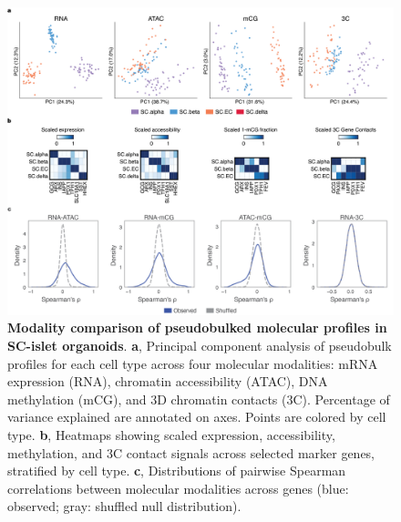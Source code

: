 \begin{figure}[p]
    \centering
    \includegraphics[width=1\textwidth]{3_figures-and-files/ExtendedFig2.png}
    \caption[Modality comparison of pseudobulked profiles]{\textbf{Modality comparison of pseudobulked molecular profiles in SC-islet organoids}. \textbf{a}, Principal component analysis of pseudobulk profiles for each cell type across four molecular modalities: mRNA expression (RNA), chromatin accessibility (ATAC), DNA methylation (mCG), and 3D chromatin contacts (3C). Percentage of variance explained are annotated on axes. Points are colored by cell type. \textbf{b}, Heatmaps showing scaled expression, accessibility, methylation, and 3C contact signals across selected marker genes, stratified by cell type. \textbf{c}, Distributions of pairwise Spearman correlations between molecular modalities across genes (blue: observed; gray: shuffled null distribution).}
    \label{fig:3 supplementary_2}
\end{figure}

